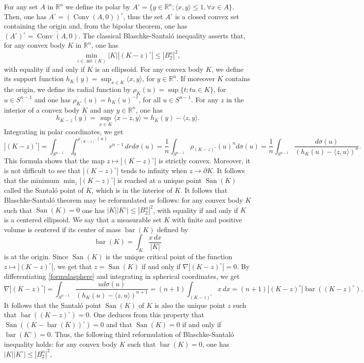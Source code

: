 \documentclass[10pt]{amsart}
\theoremstyle{definition}
\theoremstyle{remark}
\newcommand{\R}{\mathbb{R}}
\newcommand{\conv}{\operatorname{Conv}}
\newcommand{\inte}{\operatorname{int}}
\newcommand{\bary}{\operatorname{bar}}
\newcommand{\san}{\operatorname{San}}
\begin{document}
For any set $A$ in $\R^n$ we define its polar by $A^\circ=\{y\in\R^n; \langle x, y\rangle\le 1, \forall x\in A\}$. Then, one has $A^\circ=(\conv(A,0))^\circ$, thus the set $A^\circ$ is a closed convex set containing the origin and, from the bipolar theorem, one has  $(A^\circ)^\circ=\overline{\conv(A,0)}$.
The classical Blaschke-Santal\'o \cite{blaschke_book,san49} inequality asserts that, for any convex body $K$ in $\R^n$, one has 
\[
\min_{z\in\inte(K)}|K||(K-z)^\circ|\le |B_2^n|^2,
\]
with equality if and only if $K$ is an ellipsoid. For any convex body $K$, we define its support function $h_K(y)=\sup_{x\in K}\langle x,y\rangle$, for $y\in\R^n$. If moreover $K$ contains the origin, we define its radial function by $\rho_K(u)=\sup\{t; tu\in K\}$, for $u\in S^{n-1}$ and one has $\rho_{K^\circ}(u)=h_K(u)^{-1}$, for all $u\in S^{n-1}$. 
For any $z$ in the interior of a convex body $K$ and any $y\in\R^n$, one has 
\[
h_{K-z}(y)=\sup_{x\in K}\langle x-z,y\rangle=h_K(y)-\langle z,y\rangle.
\]
Integrating in polar coordinates, we get
\begin{equation}\label{formulasphere}
|(K-z)^\circ|=\int_{S^{n-1}}\int_0^{\rho_{(K-z)^\circ}(u)}r^{n-1}\,drd\sigma(u)=\frac{1}{n}\int_{S^{n-1}}\rho_{(K-z)^\circ}(u)^nd\sigma(u)=\frac{1}{n}\int_{S^{n-1}}\frac{d\sigma(u)}{(h_K(u)-\langle z,u\rangle)^n}.
\end{equation}
This formula shows that the map $z\mapsto |(K-z)^\circ|$ is strictly convex. Moreover, it is not difficult to see that $|(K-z)^\circ|$ tends to infinity when $z\to\partial K$. It follows that the minimum $\min_z|(K-z)^\circ|$ is reached at a unique point $\san(K)$ called the Santal\'o point of $K$, which is in the interior of $K$. It follows that Blaschke-Santal\'o theorem may be reformulated as follows: for any convex body $K$ such that $\san(K)=0$ one has $|K||K^\circ|\le |B_2^n|^2$,
with equality if and only if $K$ is a centered ellipsoid. We say that a measurable set $K$ with finite and positive volume is centered if its center of mass $\bary(K)$ defined by 
\[
\bary(K)=\int_K \frac{x\,dx}{|K|}
\]
is at the origin. Since $\san(K)$ is the unique critical point of the function $z\mapsto |(K-z)^\circ|$, we get that $z=\san(K)$ if and only if $\nabla|(K-z)^\circ|=0$. By differentiating \eqref{formulasphere} and integrating in spherical coordinates, we get
\[
\nabla|(K-z)^\circ|=\int_{S^{n-1}}\frac{ud\sigma(u)}{(h_K(u)-\langle z,u\rangle)^{n+1}}=(n+1)\int_{(K-z)^\circ}x\,dx=(n+1)|(K-z)^\circ|\bary((K-z)^\circ).
\]
It follows that the Santal\'o point $\san(K)$ of $K$ is also the unique point $z$ such that $\bary((K-z)^\circ)=0$. One deduces from this property that $\san((K-\bary(K))^\circ)=0$ and that $\san(K)=0$ if and only if $\bary(K^\circ)=0$. Thus, the following third reformulation of Blaschke-Santal\'o inequality holds: for any convex body $K$ such that $\bary(K)=0$, one has $|K||K^\circ|\le |B_2^n|^2$,
\end{document}
